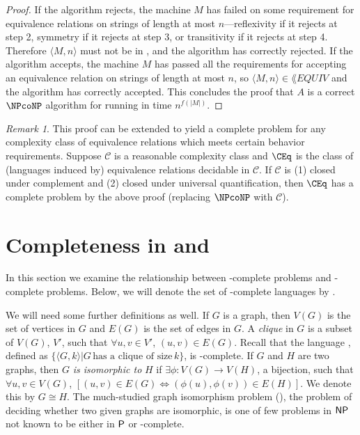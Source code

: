 \documentclass[draft]{article}
\theoremstyle{definition} \newtheorem{openproblem}[openproblem]{Open problem}
\theoremstyle{definition} \newtheorem{definition}[definition]{Definition}
\theoremstyle{remark} \newtheorem{remark}[remark]{Remark}
\newcommand{\plain}[1]{\,\text{#1}\,} %
\newcommand{\defn}[1]{\emph{#1}} %
\newcommand{\pair}[2]{\langle#1,#2\rangle} %
\begin{document}
\begin{proof}
  If the algorithm rejects, the machine $M$ has failed on some requirement for equivalence relations on strings of length at most $n$---reflexivity if it rejects at step 2, symmetry if it rejects at step 3, or transitivity if it rejects at step 4.
  Therefore $\pair{M}{n}$ must not be in , and the algorithm has correctly rejected.
  If the algorithm accepts, the machine $M$ has passed all the requirements for accepting an equivalence relation on strings of length at most $n$, so $\pair{M}{n}\in\lang{EQUIV}$ and the algorithm has correctly accepted.
  This concludes the proof that $A$ is a correct $\NPcoNP$ algorithm for  running in time $n^{f(|M|)}$.
\end{proof}

\begin{remark}
  This proof can be extended to yield a complete problem for any complexity class of equivalence relations which meets certain behavior requirements. Suppose $\mathcal{C}$ is a reasonable complexity class and $\CEq$ is the class of (languages induced by) equivalence relations decidable in $\mathcal{C}$. If $\mathcal{C}$ is (1) closed under complement and (2) closed under universal quantification, then $\CEq$ has a complete problem by the above proof (replacing $\NPcoNP$ with $\mathcal{C}$).
\end{remark}

\section{Completeness in \texorpdfstring{\NPEq}{NPEq} and \texorpdfstring{\NP}{NP}}

In this section we examine the relationship between \NP-complete problems and \NPEq-complete problems.
Below, we will denote the set of \NP-complete languages by \NPC.

We will need some further definitions as well.
If $G$ is a graph, then $V(G)$ is the set of vertices in $G$ and $E(G)$ is the set of edges in $G$.
A \defn{clique} in $G$ is a subset of $V(G)$, $V'$, such that $\forall u,v\in V'$, $(u, v)\in E(G)$.
Recall that the language , defined as $\{\pair{G}{k}|G \plain{has a clique of size} k\}$,  is \NP-complete.
If $G$ and $H$ are two graphs, then $G$ \defn{is isomorphic to} $H$ if $\exists\phi\colon V(G)\to V(H)$, a bijection, such that $\forall u,v\in V(G)$, $[(u,v)\in E(G)\iff (\phi(u), \phi(v))\in E(H)]$.
We denote this by $G\cong H$.
The much-studied graph isomorphism problem (\GI), the problem of deciding whether two given graphs are isomorphic, is one of few problems in $\NP$ not known to be either in $\P$ or \NP-complete.
\end{document}
